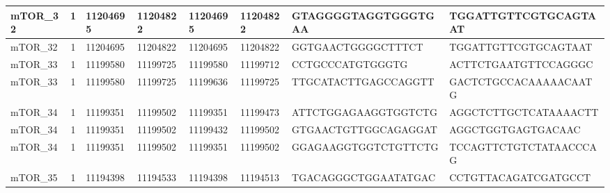 \begin{landscape}
\begin{longtable}{| p{} | p{} | p{} | p{} | p{} | p{} | p{} | p{} |}
\multicolumn{1}{|l|}{mTOR\_32}   & \multicolumn{1}{c|}{1}  & \multicolumn{1}{l|}{11204695}  & \multicolumn{1}{l|}{11204822}  & \multicolumn{1}{l|}{11204695}  & \multicolumn{1}{l|}{11204822}  & \multicolumn{1}{l|}{GTAGGGGTAGGTGGGTGAA}             & \multicolumn{1}{l|}{TGGATTGTTCGTGCAGTAAT}          \\ \hline
\multicolumn{1}{|l|}{mTOR\_32}   & \multicolumn{1}{c|}{1}  & \multicolumn{1}{l|}{11204695}  & \multicolumn{1}{l|}{11204822}  & \multicolumn{1}{l|}{11204695}  & \multicolumn{1}{l|}{11204822}  & \multicolumn{1}{l|}{GGTGAACTGGGGCTTTCT}              & \multicolumn{1}{l|}{TGGATTGTTCGTGCAGTAAT}          \\ \hline
\multicolumn{1}{|l|}{mTOR\_33}   & \multicolumn{1}{c|}{1}  & \multicolumn{1}{l|}{11199580}  & \multicolumn{1}{l|}{11199725}  & \multicolumn{1}{l|}{11199580}  & \multicolumn{1}{l|}{11199712}  & \multicolumn{1}{l|}{CCTGCCCATGTGGGTG}                & \multicolumn{1}{l|}{ACTTCTGAATGTTCCAGGGC}          \\ \hline
\multicolumn{1}{|l|}{mTOR\_33}   & \multicolumn{1}{c|}{1}  & \multicolumn{1}{l|}{11199580}  & \multicolumn{1}{l|}{11199725}  & \multicolumn{1}{l|}{11199636}  & \multicolumn{1}{l|}{11199725}  & \multicolumn{1}{l|}{TTGCATACTTGAGCCAGGTT}            & \multicolumn{1}{l|}{GACTCTGCCACAAAAACAATG}         \\ \hline
\multicolumn{1}{|l|}{mTOR\_34}   & \multicolumn{1}{c|}{1}  & \multicolumn{1}{l|}{11199351}  & \multicolumn{1}{l|}{11199502}  & \multicolumn{1}{l|}{11199351}  & \multicolumn{1}{l|}{11199473}  & \multicolumn{1}{l|}{ATTCTGGAGAAGGTGGTCTG}            & \multicolumn{1}{l|}{AGGCTCTTGCTCATAAAACTT}         \\ \hline
\multicolumn{1}{|l|}{mTOR\_34}   & \multicolumn{1}{c|}{1}  & \multicolumn{1}{l|}{11199351}  & \multicolumn{1}{l|}{11199502}  & \multicolumn{1}{l|}{11199432}  & \multicolumn{1}{l|}{11199502}  & \multicolumn{1}{l|}{GTGAACTGTTGGCAGAGGAT}            & \multicolumn{1}{l|}{AGGCTGGTGAGTGACAAC}            \\ \hline
\multicolumn{1}{|l|}{mTOR\_34}   & \multicolumn{1}{c|}{1}  & \multicolumn{1}{l|}{11199351}  & \multicolumn{1}{l|}{11199502}  & \multicolumn{1}{l|}{11199351}  & \multicolumn{1}{l|}{11199502}  & \multicolumn{1}{l|}{GGAGAAGGTGGTCTGTTCTG}            & \multicolumn{1}{l|}{TCCAGTTCTGTCTATAACCCAG}        \\ \hline
\multicolumn{1}{|l|}{mTOR\_35}   & \multicolumn{1}{c|}{1}  & \multicolumn{1}{l|}{11194398}  & \multicolumn{1}{l|}{11194533}  & \multicolumn{1}{l|}{11194398}  & \multicolumn{1}{l|}{11194513}  & \multicolumn{1}{l|}{TGACAGGGCTGGAATATGAC}            & \multicolumn{1}{l|}{CCTGTTACAGATCGATGCCT}          \\ \hline

\end{longtable}
\end{landscape}
